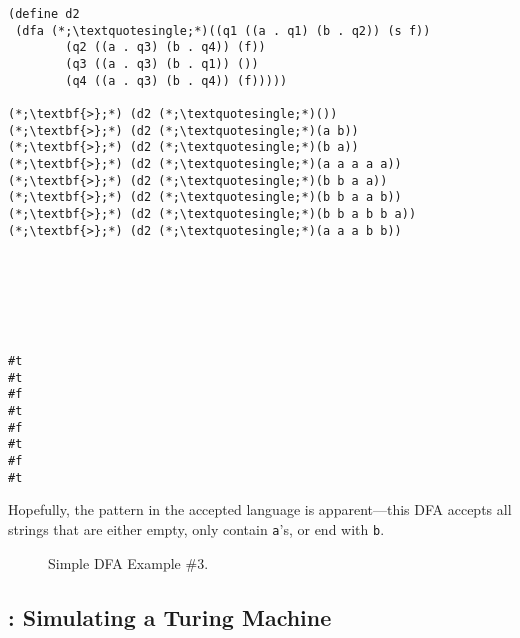 \begin{cloast}[]{}
\begin{lstlisting}[language=MyScheme]
(define d2 
 (dfa (*;\textquotesingle;*)((q1 ((a . q1) (b . q2)) (s f))
        (q2 ((a . q3) (b . q4)) (f))
        (q3 ((a . q3) (b . q1)) ())
        (q4 ((a . q3) (b . q4)) (f)))))

(*;\textbf{>};*) (d2 (*;\textquotesingle;*)())
(*;\textbf{>};*) (d2 (*;\textquotesingle;*)(a b))
(*;\textbf{>};*) (d2 (*;\textquotesingle;*)(b a))
(*;\textbf{>};*) (d2 (*;\textquotesingle;*)(a a a a a))
(*;\textbf{>};*) (d2 (*;\textquotesingle;*)(b b a a))
(*;\textbf{>};*) (d2 (*;\textquotesingle;*)(b b a a b))
(*;\textbf{>};*) (d2 (*;\textquotesingle;*)(b b a b b a))
(*;\textbf{>};*) (d2 (*;\textquotesingle;*)(a a a b b))
\end{lstlisting}
\tcblower
\begin{lstlisting}[language=MyOutput]






#t
#t
#f
#t
#f
#t
#f
#t
\end{lstlisting}
\end{cloast}

Hopefully, the pattern in the accepted language is apparent---this DFA accepts all strings that are either empty, only contain \texttt{a}'s, or end with \texttt{b}.

\begin{figure}[H]
\begin{center}
\end{center}
\caption{Simple DFA Example \#3.}
\label{fig:dfanest3}
\end{figure}

\clearpage
\subsection*{: Simulating a Turing Machine}

